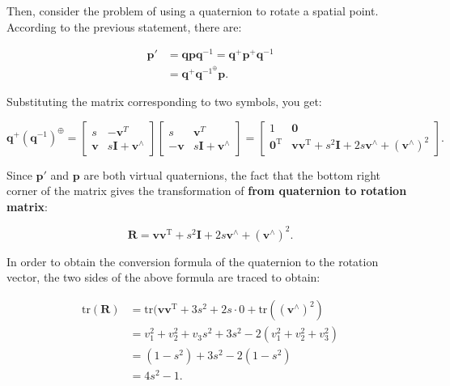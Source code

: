 Then, consider the problem of using a quaternion to rotate a spatial point. According to the previous statement, there are:

\begin{equation}
\begin{split}
\bm{p}' &= \bm{q} \bm{p} \bm{q}^{-1} = \bm{q}^+ \bm{p}^+ \bm{q}^{-1} \\
&= \bm{q}^+ \bm{q}^{{-1}^{\oplus}} \bm{p}.
\end{split}
\end{equation}

Substituting the matrix corresponding to two symbols, you get:

\begin{equation}\label{eq:quaternion-to-rotation-matrix-derive}
{\bm{q}^ + }{\left( {{\bm{q}^{ - 1}}} \right)^ \oplus } = \left[ \begin{array}{*{20}{c}}
	s&-\bm{v}^T\\
	\bm{v}&s\bm{I}+\bm{v}^\wedge 
	\end{array} \right]\left[\begin{array}{*{20}{c}}
	s&{\bm{v} ^T}\\
	{ - \bm{v} }&{s\bm{I} + \bm{v} ^ \wedge }
	\end{array} \right] = \left[ \begin{array}{*{20}{c}}
	1&\bm{0} \\
	\bm{0}^\mathrm{T}&\bm{v}\bm{v}^\mathrm{T} + {s^2} \bm{I} + 2s\bm{v} ^ \wedge + {(\bm{v} ^ \wedge)}^2 
	\end{array} \right].
\end{equation}

Since $ \bm{p}' $ and $ \bm{p} $ are both virtual quaternions, the fact that the bottom right corner of the matrix gives the transformation of \textbf{from quaternion to rotation matrix}:

\begin{equation}
\bm{R} = \bm{v} \bm{v}^\mathrm{T} + {s^2} \bm{I} + 2s\bm{v} ^ \wedge + {(\bm{v} ^ \wedge)}^2.
\end{equation}

In order to obtain the conversion formula of the quaternion to the rotation vector, the two sides of the above formula are traced to obtain:

\begin{equation}
\begin{aligned}
\mathrm{tr}(\bm{R}) &= \mathrm{tr}(\bm{v}\bm{v}^\mathrm{T} + 3s^2 + 2s \cdot 0 + \mathrm{tr}((\bm{v}^\wedge)^2) \\
& = v_1 ^ 2 + v_2 ^ 2 + v_3s ^ 2 + 3s ^ 2 - 2 (v_1 ^ 2 + v_2 ^ 2 + v_3 ^ 2) \\
&= (1-s^2) + 3s^2 -2(1-s^2)\\
&= 4s^2 -1.
\end{aligned}
\end{equation}

